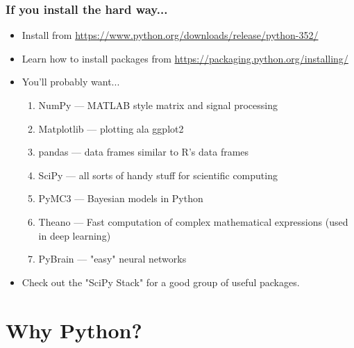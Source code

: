 \documentclass{beamer}\usepackage[]{graphicx}\usepackage[]{color}
\begin{document}
\begin{frame}
\frametitle{If you install the hard way...}

\begin{itemize}
	\item Install from \url{https://www.python.org/downloads/release/python-352/}

	\item Learn how to install packages from \url{https://packaging.python.org/installing/}

	\item You'll probably want...

		\begin{enumerate}
		\item NumPy --- MATLAB style matrix and signal processing

		\item Matplotlib --- plotting ala ggplot2

		\item pandas --- data frames similar to R's data frames

		\item SciPy --- all sorts of handy stuff for scientific computing

		\item PyMC3 --- Bayesian models in Python

		\item Theano --- Fast computation of complex mathematical expressions (used in deep learning)

		\item PyBrain --- "easy" neural networks

	\end{enumerate}
	\item Check out the "SciPy Stack" for a good group of useful packages.

\end{itemize}

\end{frame}

\section{Why Python?}
\end{document}
